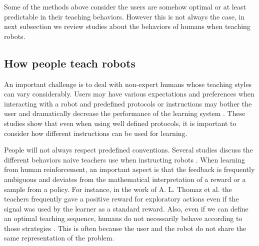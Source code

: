 Some of the methods above consider the users are somehow optimal or at least predictable in their teaching behaviors. However this is not always the case, in next subsection we review studies about the behaviors of humans when teaching robots.

\subsection{How people teach robots}

An important challenge is to deal with non-expert humans whose teaching styles can vary considerably. Users may have various expectations and preferences when interacting with a robot and predefined protocols or instructions may bother the user and dramatically decrease the performance of the learning system \cite{thomaz2008teachable,kaochar2011towards,knox2012humans,rouanet2013impact}. These studies show that even when using well defined protocols, it is important to consider how different instructions can be used for learning.

People will not always respect predefined conventions. Several studies discuss the different behaviors naive teachers use when instructing robots \cite{thomaz2008teachable,Cakmak2010optimality}. When learning from human reinforcement, an important aspect is that the feedback is frequently ambiguous and deviates from the mathematical interpretation of a reward or a sample from a policy. For instance, in the work of A. L. Thomaz et al. \cite{thomaz2008teachable} the teachers frequently gave a positive reward for exploratory actions even if the signal was used by the learner as a standard reward. Also, even if we can define an optimal teaching sequence, humans do not necessarily behave according to those strategies \cite{Cakmak2010optimality}. This is often because the user and the robot do not share the same representation of the problem.

